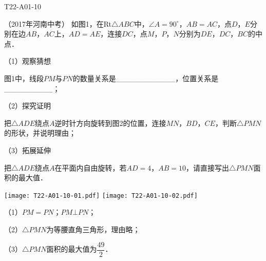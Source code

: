 \begin{defproblem}{T22-A01-10}%
\begin{onlyproblem}%
（2017年河南中考）
如图1，在Rt$\triangle ABC$中，$\angle  A =90 ^{\circ }$，$AB=AC$，点$D$，$E$分别在边$AB$，$AC$上，$AD=AE$，连接$DC$，点$M$，$P$，$N$分别为$DE$，$DC$，$BC$的中点．

（1）观察猜想

图1中，线段$PM$与$PN$的数量关系是{\_}{\_}{\_}{\_}{\_}{\_}{\_}{\_}{\_}{\_}{\_}，位置关系是{\_}{\_}{\_}{\_}{\_}{\_}{\_}{\_}{\_}；

（2）探究证明

把$\triangle ADE$绕点$A$逆时针方向旋转到图2的位置，连接$MN$，$BD$，$CE$，判断$\triangle PMN$的形状，并说明理由；

（3）拓展延伸

把$\triangle ADE$绕点$A$在平面内自由旋转，若$AD=4$，$AB=10$，请直接写出$\triangle PMN$面积的最大值．


\begin{center}
\texttt{[image: T22-A01-10-01.pdf]}\qquad
\texttt{[image: T22-A01-10-02.pdf]}
\end{center}



\end{onlyproblem}%
\begin{onlysolution}%
（1）$PM=PN$；$PM \bot  PN$；

（2）$\triangle PMN$为等腰直角三角形，理由略；

（3）$\triangle PMN$面积的最大值为$\dfrac{49}{2}$．
\begin{center}
\end{center}
\end{onlysolution}%
\end{defproblem}







